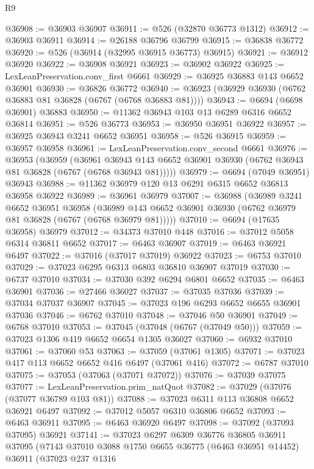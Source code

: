 \begin{lexlean}{R9}
\begin{coremodule}
@36908 := @36903 @36907
@36911 := @526 (@32870 @36773 @1312)
@36912 := @36903 @36911
@36914 := @26188 @36796 @36799
@36915 := @36838 @36772
@36920 := @526 (@36914 (@32995 @36915 @36773) @36915)
@36921 := @36912 @36920
@36922 := @36908 @36921
@36923 := @36902 @36922
@36925 := LexLeanPreservation.conv_first @6661
@36929 := @36925 @36883 @143 @6652 @36901
@36930 := @36826 @36772
@36940 := @36923 (@36929 @36930 (@6762 @36883 @81 @36828 (@6767 (@6768 @36883 @81))))
@36943 := @6694 (@6698 @36901) @36883
@36950 := @11362 @36943 @103 @13 @6289 @6316 @6652 @36814
@36951 := @526 @36773
@36953 := @36950 @36951 @36922
@36957 := @36925 @36943 @3241 @6652 @36951
@36958 := @526 @36915
@36959 := @36957 @36958
@36961 := LexLeanPreservation.conv_second @6661
@36976 := @36953
    (@36959
      (@36961 @36943 @143 @6652 @36901 @36930 (@6762 @36943 @81 @36828 (@6767 (@6768 @36943 @81)))))
@36979 := @6694 (@7049 @36951) @36943
@36988 := @11362 @36979 @120 @13 @6291 @6315 @6652 @36813 @36958 @36922
@36989 := @36961 @36979
@37007 := @36988
    (@36989
      @3241
      @6652
      @36951
      @36958
      (@36989 @143 @6652 @36901 @36930 (@6762 @36979 @81 @36828 (@6767 (@6768 @36979 @81)))))
@37010 := @6694 (@17635 @36958) @36979
@37012 := @34373 @37010 @448
@37016 := @37012 @5058 @6314 @36811 @6652
@37017 := @6463 @36907
@37019 := @6463 @36921 @6497
@37022 := @37016 (@37017 @37019) @36922
@37023 := @6753 @37010
@37029 := @37023 @6295 @6313 @6803 @36810 @36907 @37019
@37030 := @6737 @37010
@37034 := @37030 @392 @6294 @6801 @6652
@37035 := @6463 @36901
@37036 := @27466 @36027
@37037 := @37035 @37036
@37039 := @37034 @37037 @36907
@37045 := @37023 @196 @6293 @6652 @6655 @36901 @37036
@37046 := @6762 @37010
@37048 := @37046 @50 @36901
@37049 := @6768 @37010
@37053 := @37045 (@37048 (@6767 (@37049 @50)))
@37059 := @37023 @1306 @419 @6652 @6654 @1305 @36027
@37060 := @6932 @37010
@37061 := @37060 @53
@37063 := @37059 (@37061 @1305)
@37071 := @37023 @417 @113 @6652 @6652 @416 @6497 (@37061 @416)
@37072 := @6787 @37010
@37075 := @37053 (@37063 (@37071 @37072))
@37076 := @37039 @37075
@37077 := LexLeanPreservation.prim_natQuot
@37082 := @37029 (@37076 (@37077 @36789 @103 @81))
@37088 := @37023 @6311 @113 @36808 @6652 @36921 @6497
@37092 := @37012 @5057 @6310 @36806 @6652
@37093 := @6463 @36911
@37095 := @6463 @36920 @6497
@37098 := @37092 (@37093 @37095) @36921
@37141 := @37023
    @6297
    @6309
    @36776
    @36805
    @36911
    @37095
    (@7143
      @37010
      @3088
      @1750
      @6655
      @36775
      (@6463 @36951 @14452)
      @36911
      (@37023
        @237
        @1316

\end{coremodule}
\end{lexlean}
